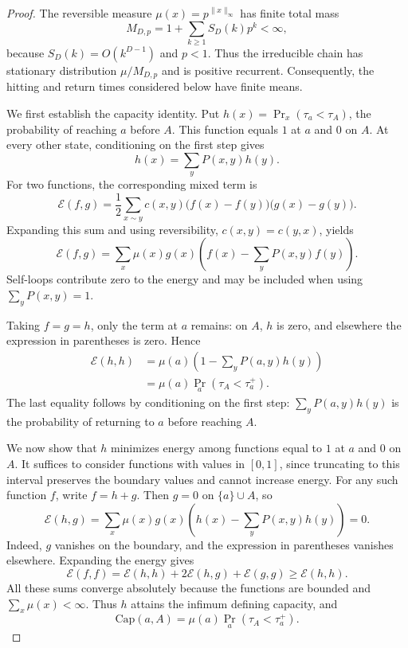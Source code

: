 \documentclass[conference]{IEEEtran}
\newcommand{\norm}[1]{\lVert #1\rVert}
\begin{document}
\begin{proof}
The reversible measure $\mu(x)=p^{\norm{x}_\infty}$ has finite
total mass
\[
M_{D,p}=1+\sum_{k\ge1}S_D(k)p^k<\infty,
\]
because $S_D(k)=O(k^{D-1})$ and $p<1$.
Thus the irreducible chain has stationary distribution
$\mu/M_{D,p}$ and is positive recurrent. Consequently, the
hitting and return times considered below have finite means.

We first establish the capacity identity. Put
$h(x)=\Pr_x(\tau_a<\tau_A)$, the probability of reaching $a$
before $A$. This function equals $1$ at $a$ and $0$ on $A$.
At every other state, conditioning on the first step gives
\[
h(x)=\sum_yP(x,y)h(y).
\]
For two functions, the corresponding mixed term is
\[
\mathcal E(f,g)
=\frac12\sum_{x\sim y}c(x,y)
\bigl(f(x)-f(y)\bigr)\bigl(g(x)-g(y)\bigr).
\]
Expanding this sum and using reversibility,
$c(x,y)=c(y,x)$, yields
\[
\mathcal E(f,g)
=\sum_x\mu(x)g(x)
\left(f(x)-\sum_yP(x,y)f(y)\right).
\]
Self-loops contribute zero to the energy and may be included
when using $\sum_yP(x,y)=1$.

Taking $f=g=h$, only the term at $a$ remains: on $A$,
$h$ is zero, and elsewhere the expression in parentheses
is zero. Hence
\[
\begin{aligned}
\mathcal E(h,h)
&=\mu(a)\left(1-\sum_yP(a,y)h(y)\right)\\
&=\mu(a)\Pr_a(\tau_A<\tau_a^+).
\end{aligned}
\]
The last equality follows by conditioning on the first step:
$\sum_yP(a,y)h(y)$ is the probability of returning to $a$
before reaching $A$.

We now show that $h$ minimizes energy among functions equal
to $1$ at $a$ and $0$ on $A$. It suffices to consider functions
with values in $[0,1]$, since truncating to this interval
preserves the boundary values and cannot increase energy.
For any such function $f$, write $f=h+g$. Then $g=0$ on
$\{a\}\cup A$, so
\[
\mathcal E(h,g)
=\sum_x\mu(x)g(x)
\left(h(x)-\sum_yP(x,y)h(y)\right)=0.
\]
Indeed, $g$ vanishes on the boundary, and the expression in
parentheses vanishes elsewhere. Expanding the energy gives
\[
\mathcal E(f,f)
=\mathcal E(h,h)+2\mathcal E(h,g)+\mathcal E(g,g)
\ge\mathcal E(h,h).
\]
All these sums converge absolutely because the functions
are bounded and $\sum_x\mu(x)<\infty$. Thus $h$ attains
the infimum defining capacity, and
\[
\mathrm{Cap}(a,A)
=\mu(a)\Pr_a(\tau_A<\tau_a^+).
\]


\end{proof}
\end{document}
